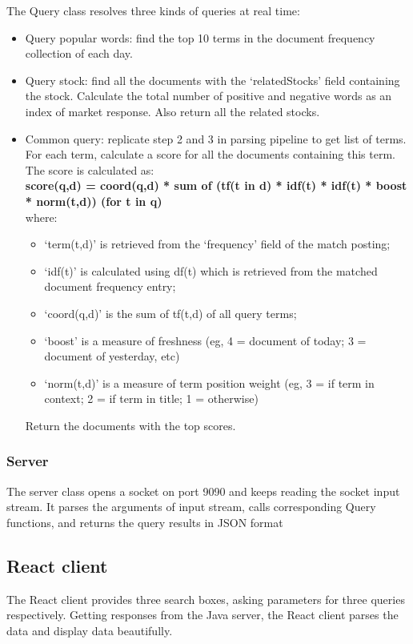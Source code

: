 \documentclass{article}
\begin{document}
The Query class resolves three kinds of queries at real time: 
\begin{itemize}
  \item Query popular words: find the top 10 terms in the document frequency collection of each day. 
  \item Query stock: find all the documents with the `relatedStocks' field containing the stock. Calculate the total number of positive and negative words as an index of market response. Also return all the related stocks.
  \item Common query: replicate step 2 and 3 in parsing pipeline to get list of terms. For each term, calculate a score for all the documents containing this term. The score is calculated as:\\
  \textbf{score(q,d) = coord(q,d) * sum of (tf(t in d) * idf(t) * idf(t) * boost * norm(t,d)) (for t in q)} \\
  where:
  \begin{itemize}
    \item `term(t,d)' is retrieved from the `frequency' field of the match posting; 
    \item `idf(t)' is calculated using df(t) which is retrieved from the matched document frequency entry; 
    \item `coord(q,d)' is the sum of tf(t,d) of all query terms; 
    \item `boost' is a measure of freshness (eg, 4 = document of today; 3 = document of yesterday, etc)
    \item `norm(t,d)' is a measure of term position weight (eg, 3 = if term in context; 2 = if term in title; 1 = otherwise)
  \end{itemize}
  Return the documents with the top scores.
\end{itemize}

\subsubsection{Server}
The server class opens a socket on port 9090 and keeps reading the socket input stream. It parses the arguments of input stream, calls corresponding Query functions, and returns the query results in JSON format

\subsection{React client}
The React client provides three search boxes, asking parameters for three queries respectively. Getting responses from the Java server, the React client parses the data and display data beautifully. 
\end{document}
